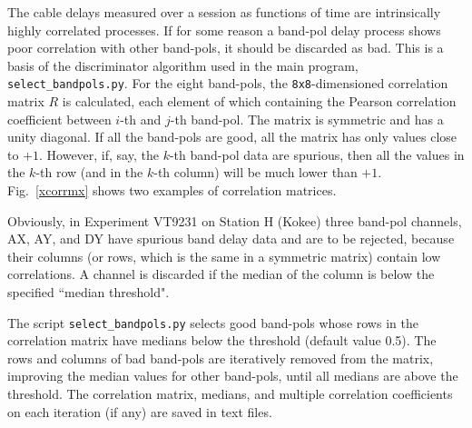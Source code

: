 \documentclass[preprint]{aastex}
\begin{document}
The cable delays measured over a session as functions of time are intrinsically highly correlated processes. If for some reason a band-pol delay process shows poor correlation with other band-pols, it should be discarded as bad. This is a basis of the discriminator algorithm used in the main program, \texttt{select\_bandpols.py}. For the eight band-pols, the \texttt{8x8}-dimensioned correlation matrix $R$ is calculated, each element of which containing the Pearson correlation coefficient between $i$-th and $j$-th band-pol. The matrix is symmetric and has a unity diagonal. If all the band-pols are good, all the matrix has only values close to $+1$. However, if, say, the $k$-th band-pol data are spurious, then all the values in the $k$-th row (and in the $k$-th column) will be much lower than $+1$. Fig.~\ref{xcorrmx} shows two examples of correlation matrices.

\begin{figure*}   [ht!]
\caption{\small Visualization of the correlation matrices for two experiments, VT8347 on Station E (Westford) and VT9231 on Station H (Kokee). Since the correlation matrices are symmetric with the unities on the diagonal, only the upper triangle above the diagonal is shown. The matrix in the left panel contains the Pearson correlation coefficients very close to +1 because the band delay curves are highly correlated between each other. The right-panel correlation matrix demonstrates poor correlation of band-pols AX, AY, and DY with other band-pols. 
\label{xcorrmx}}
\end{figure*}

%
%

Obviously, in Experiment VT9231 on Station H (Kokee) three band-pol channels, AX, AY, and DY have spurious band delay data and are to be rejected, because their columns (or rows, which is the same in a symmetric matrix) contain low correlations. A channel is discarded if the median of the column is below the specified ``median threshold". 

The script \texttt{select\_bandpols.py} selects good band-pols whose rows in the correlation matrix have medians below the threshold (default value 0.5). The rows and columns of bad band-pols are iteratively removed from the matrix, improving the median values for other band-pols, until all medians are above the threshold. The correlation matrix, medians, and multiple correlation coefficients on each iteration (if any) are saved in text files.
\end{document}
